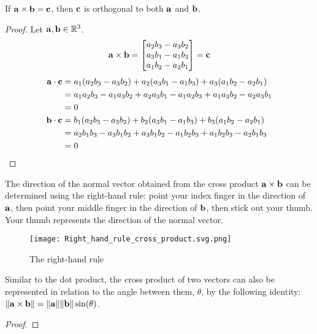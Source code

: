 \documentclass[../main.tex]{subfiles}
\begin{document}
\begin{theorem}
	If $\mathbf{a}\times\mathbf{b}=\mathbf{c}$, then
	$\mathbf{c}$ is orthogonal to both $\mathbf{a}$ and $\mathbf{b}$.
\end{theorem}

\begin{proof}
	Let $\mathbf{a}, \mathbf{b} \in \mathbb{R}^3$.
	$$\mathbf{a}\times\mathbf{b} =\begin{bmatrix}a_2b_3-a_3b_2\\a_3b_1-a_1b_3\\a_1b_2-a_2b_1\end{bmatrix}=\mathbf{c}$$
	\begin{align*}
		\mathbf{a}\cdot\mathbf{c} & =a_1(a_2b_3-a_3b_2)+a_2(a_3b_1-a_1b_3)+a_3(a_1b_2-a_2b_1)    \\
		                      & =a_1a_2b_3-a_1a_3b_2+a_2a_3b_1-a_1a_2b_3+a_1a_3b_2-a_2a_3b_1 \\
		                      & =0                                                           \\
		\mathbf{b}\cdot\mathbf{c} & =b_1(a_2b_3-a_3b_2)+b_2(a_3b_1-a_1b_3)+b_3(a_1b_2-a_2b_1)    \\
		                      & =a_2b_1b_3-a_3b_1b_2+a_3b_1b_2-a_1b_2b_3+a_1b_2b_3-a_2b_1b_3 \\
		                      & =0
	\end{align*}
\end{proof}

The direction of the normal vector obtained from the cross product $\mathbf{a}\times\mathbf{b}$
can be determined using the right-hand rule: point your index finger in
the direction of $\mathbf{a}$, then point your middle finger in the direction of
$\mathbf{b}$, then stick out your thumb. Your thumb represents the direction of the
normal vector.

\begin{figure}[H]
	\centering
	\texttt{[image: Right\_hand\_rule\_cross\_product.svg.png]}
	\caption{The right-hand rule}
\end{figure}

Similar to the dot product, the cross product of two vectors can also
be represented in relation to the angle between them, $\theta$,
by the following identity: $\|\mathbf{a}\times\mathbf{b}\|=\|\mathbf{a}\|\|\mathbf{b}\|\sin (\theta)$.

\begin{proof}
\end{proof}
\end{document}
